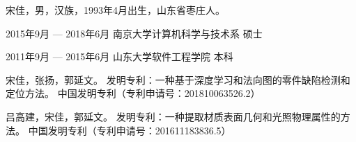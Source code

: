 \begin{resume}
\begin{authorinfo}
\noindent 宋佳，男，汉族，1993年4月出生，山东省枣庄人。
\end{authorinfo}
\begin{education}
\item[2015年9月 --- 2018年6月] 南京大学计算机科学与技术系 \hfill 硕士
\item[2011年9月 --- 2015年6月] 山东大学软件工程学院 \hfill 本科
\end{education}
\begin{publications}
\item 宋佳，张扬，郭延文。
发明专利：一种基于深度学习和法向图的零件缺陷检测和定位方法。
中国发明专利（专利申请号：201810063526.2）
\item 吕高建，宋佳，郭延文。
发明专利：一种提取材质表面几何和光照物理属性的方法。
中国发明专利（专利申请号：201611183836.5）
\end{publications}
\end{resume}
